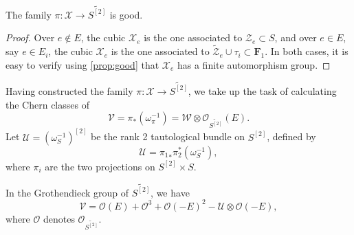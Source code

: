 \documentclass[12pt,reqno]{amsart}
\renewcommand{\to}{{\longrightarrow}}
\numberwithin{equation}{section}
\renewcommand{\O}{\mathcal O}
\newcommand{\F}{\mathbf F}
\newcommand{\td}{\widetilde}
\begin{document}
\begin{proposition}
  \label{prop:good4} The family $\pi: \mathcal{X} \to \td{S^{[2]}}$ is
  good.
\end{proposition}
\begin{proof}
  Over $e \not \in E$, the cubic $\mathcal X_e$ is the one associated to $\mathcal Z_e \subset S$, and over $e \in E$, say $e \in E_i$, the cubic $\mathcal X_e$ is the one associated to $\widetilde {\mathcal Z}_e \cup \tau_i \subset \F_1$.
  In both cases, it is easy to verify using \autoref{prop:good} that $\mathcal X_e$ has a finite automorphism group.
\end{proof}

Having constructed the family $\pi \colon \mathcal X \to \widetilde{S^{[2]}}$, we take up the task of calculating the Chern classes of
\[ \mathcal V = \pi_* \left(\omega_\pi^{-1}\right) = \mathcal W \otimes \O_{\widetilde{S^{[2]}}}(E).\]
Let $\mathcal U = \left(\omega_S^{-1}\right)^{[2]}$ be the rank 2 tautological bundle on $S^{[2]}$, defined by
\[ \mathcal U = {\pi_1}_*\pi_2^* \left(\omega_S^{-1}\right),\]
where $\pi_i$ are the two projections on $S^{[2]} \times S$.
\begin{proposition}\label{prop:v4groth}
  In the Grothendieck group of $\widetilde {S^{[2]}}$, we have
  \[
    \mathcal V =  \O(E) + \O^3 + \O(-E)^2 - \mathcal U \otimes \O(-E),
  \]
  where $\O$ denotes $\O_{\widetilde{S^[2]}}$.
\end{proposition}
\end{document}

